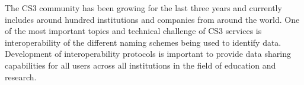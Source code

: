 The CS3 community has been growing for the last three years and currently includes around hundred institutions and companies from around the world. One of the most important topics and technical challenge of CS3 services is interoperability of the different naming schemes being used to identify data. Development of interoperability protocols is important to provide data sharing capabilities for all users across all institutions in the field of education and research.






